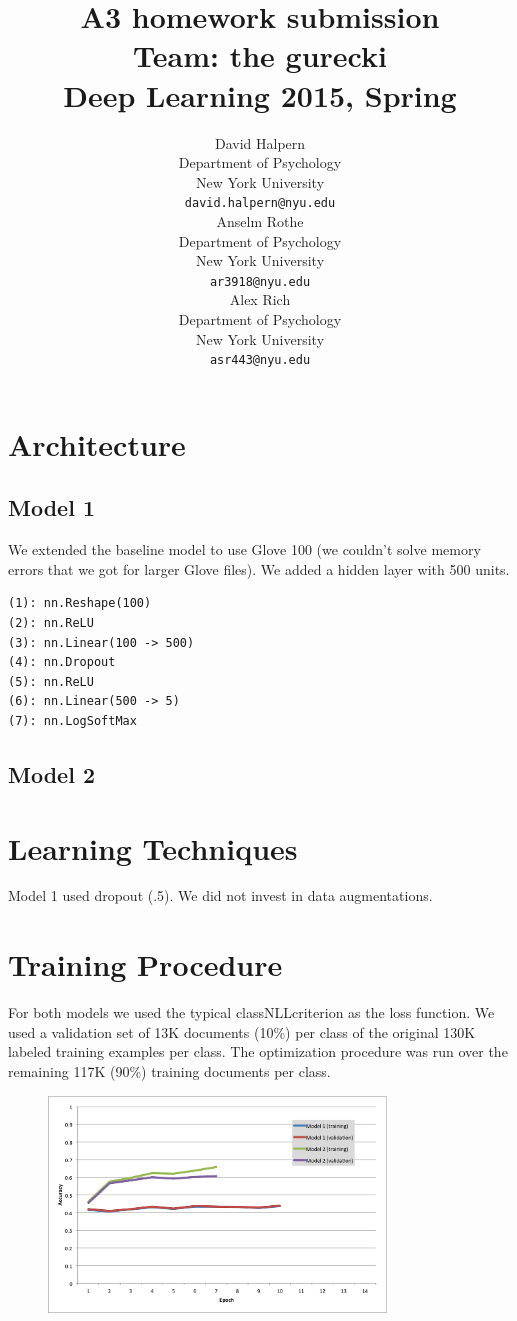 \documentclass{article} %
\title{A3 homework submission \\ Team: the gurecki \\ Deep Learning 2015, Spring}
\author{
David Halpern\\
Department of Psychology\\
New York University\\
\texttt{david.halpern@nyu.edu} \\
\And
Anselm Rothe\\
Department of Psychology\\
New York University\\
\texttt{ar3918@nyu.edu} \\
\AND
Alex Rich\\
Department of Psychology\\
New York University\\
\texttt{asr443@nyu.edu} \\
}
\begin{document}
\maketitle


\section{Architecture}

\subsection{Model 1}

We extended the baseline model to use Glove 100 (we couldn't solve memory errors that we got for larger Glove files).
We added a hidden layer with 500 units.

\begin{verbatim}
(1): nn.Reshape(100)
(2): nn.ReLU
(3): nn.Linear(100 -> 500)
(4): nn.Dropout
(5): nn.ReLU
(6): nn.Linear(500 -> 5)
(7): nn.LogSoftMax
\end{verbatim}



\subsection{Model 2}


\section{Learning Techniques}

Model 1 used dropout (.5). We did not invest in data augmentations. 

\section{Training Procedure}

For both models we used the typical classNLLcriterion as the loss function. We used a validation set of 13K documents (10\%) per class of the original 130K labeled training examples per class.
The optimization procedure was run over the remaining 117K (90\%) training documents per class.

\begin{figure}
	\includegraphics[width=0.8\textwidth]{Training}
\end{figure}
\end{document}
